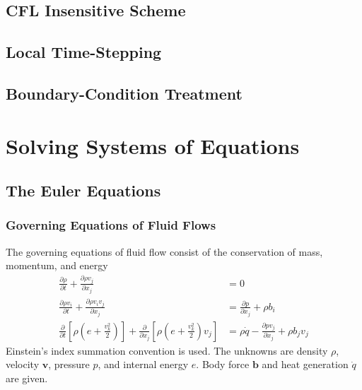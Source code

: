 \documentclass{turgon}
\begin{document}
\section{CFL Insensitive Scheme}
\label{s:cese:ctau}

\section{Local Time-Stepping}
\label{s:cese:lts}

\section{Boundary-Condition Treatment}
\label{s:cese:bc}

\chapter{Solving Systems of Equations}
\label{c:syseq}

\section{The Euler Equations}
\label{s:syseq:euler}

\subsection{Governing Equations of Fluid Flows}

The governing equations of fluid flow consist of the conservation of mass,
momentum, and energy
%
\begin{align}
  \frac{\partial\rho}{\partial t} + \frac{\partial\rho v_j}{\partial x_j}
  &= 0
  \label{e:euler:mass}
  \\
  \frac{\partial\rho v_i}{\partial t}
  + \frac{\partial\rho v_iv_j}{\partial x_j}
  &= \frac{\partial p}{\partial x_j} + \rho b_i
  \label{e:euler:momentum}
  \\
  \frac{\partial}{\partial t}
  \left[\rho\left( e + \frac{v_k^2}{2} \right)\right]
  + \frac{\partial}{\partial x_j}
  \left[\rho\left( e + \frac{v_k^2}{2} \right)v_j\right]
  &= \rho \dot{q} - \frac{\partial pv_j}{\partial x_j} + \rho b_jv_j
  \label{e:euler:energy}
\end{align}
%
Einstein's index summation convention is used.
The unknowns are density $\rho$, velocity $\mathbf{v}$, pressure $p$, and
internal energy $e$.
Body force $\mathbf{b}$ and heat generation $\dot{q}$ are given.
\end{document}
